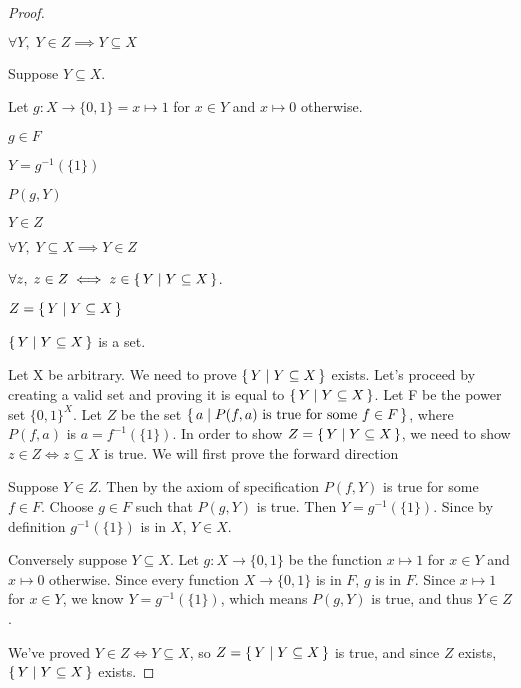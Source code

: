 \documentclass[../../main.tex]{subfiles}
\begin{document}
\begin{enumerate}
\begin{proof}
\begin{lxl}
            \item $\forall Y, \; Y \in Z \implies Y \subseteq X$
            \item Suppose $Y \subseteq X$.
            \begin{lxl}
                \item Let $g: X \to \{0, 1\} = x \mapsto 1$ for $x \in Y$ and $x \mapsto 0$ otherwise. 
                \item $g \in F$ 
                \item $Y = g^{-1}(\{1\})$ 
                \item $P(g, Y)$ 
                \item $Y \in Z$ 
            \end{lxl}
            \item $\forall Y, \; Y \subseteq X \implies Y \in Z$
            \item $\forall z, \; z \in Z \iff z \in \{\,Y\mid Y \subseteq X\,\}$. 
            \item $Z = \{\,Y\mid Y \subseteq X\,\}$
            \item $\{\,Y\mid Y \subseteq X\,\}$ is a set.
        \end{lxl}

    Let X be arbitrary. 
    We need to prove $\{\,Y\mid Y \subseteq X\,\}$ exists. 
    Let's proceed by creating a valid set and proving it is equal to $\{\,Y\mid Y \subseteq X\,\}$.
    Let F be the power set $\{0,1\}^X$. 
    Let $Z$ be the set $\Set{a}{P(f, a)$ is true for some $f \in F}$, where $P(f,a)$ is $a = f^{-1}(\{1\})$. 
    In order to show $Z=\{\,Y\mid Y \subseteq X\,\}$, we need to show $z \in Z \iff z \subseteq X$ is true.
    We will first prove the forward direction

    Suppose $Y \in Z$. 
    Then by the axiom of specification $P(f, Y)$ is true for some $f \in F$. 
    Choose $g \in F$ such that $P(g, Y)$ is true. 
    Then $Y = g^{-1}(\{1\})$.
    Since by definition $g^{-1}(\{1\})$ is in $X$, $Y \in X$.

    Conversely suppose $Y \subseteq X$.
    Let $g : X \to \{0, 1\}$ be the function $x \mapsto 1$ for $x \in Y$ and $x \mapsto 0$ otherwise. Since every function $X \to \{0, 1\}$ is in $F$, $g$ is in $F$. Since $x \mapsto 1$ for $x \in Y$, we know $Y = g^{-1}(\{1\})$, which means $P(g, Y)$ is true, and thus $Y \in Z$.

    We've proved $Y \in Z \iff Y \subseteq X$, so $Z=\{\,Y\mid Y \subseteq X\,\}$ is true, and since $Z$ exists, $\{\,Y\mid Y \subseteq X\,\}$ exists.
    \end{proof}


\end{enumerate}
\end{document}
